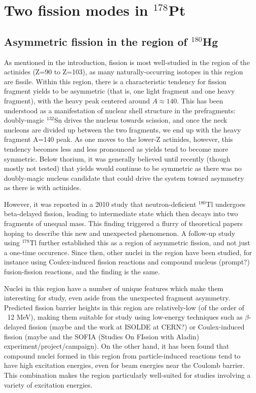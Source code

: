 \chapter{Two fission modes in $^{178}$Pt}\label{chap:178Pt}

\maketitle

\section{Asymmetric fission in the region of $^{180}$Hg}
As mentioned in the introduction, fission is most well-studied in the region of the actinides (Z=90 to Z=103), as many naturally-occurring isotopes in this region are fissile. Within this region, there is a characteristic tendency for fission fragment yields to be asymmetric (that is, one light fragment and one heavy fragment), with the heavy peak centered around $A\approx140$. This has been understood as a manifestation of nuclear shell structure in the prefragments: doubly-magic $^{132}$Sn drives the nucleus towards scission, and once the neck nucleons are divided up between the two fragments, we end up with the heavy fragment A=140 peak. As one moves to the lower-Z actinides, however, this tendency becomes less and less pronounced as yields tend to become more symmetric. Below thorium, it was generally believed until recently (though mostly not tested) that yields would continue to be symmetric as there was no doubly-magic nucleus candidate that could drive the system toward asymmetry as there is with actinides.

However, it was reported in a 2010 study \cite{Andreyev2010} that neutron-deficient $^{180}$Tl undergoes beta-delayed fission, leading to intermediate state {\Hg} which then decays into two fragments of unequal mass. This finding triggered a flurry of theoretical papers hoping to describe this new and unexpected phenomenon. A follow-up study using $^{178}$Tl \cite{Liberati2013} further established this as a region of asymmetric fission, and not just a one-time occurence. Since then, other nuclei in the region have been studied, for instance using Coulex-induced fission reactions and compound nucleus (prompt?) fusion-fission reactions, and the finding is the same. 

Nuclei in this region have a number of unique features which make them interesting for study, even aside from the unexpected fragment asymmetry. Predicted fission barrier heights in this region are relatively-low (of the order of ~12 MeV), making them suitable for study using low-energy techniques such as $\beta$-delayed fission (maybe \cite{Andreyev2013} and the work at ISOLDE at CERN?) or Coulex-induced fission (maybe \cite{Martin2015} and the SOFIA (Studies On FIssion with Aladin) experiment/project/campaign). On the other hand, it has been found that compound nuclei formed in this region from particle-induced reactions tend to have high excitation energies, even for beam energies near the Coulomb barrier. This combination makes the region particularly well-suited for studies involving a variety of excitation energies.

